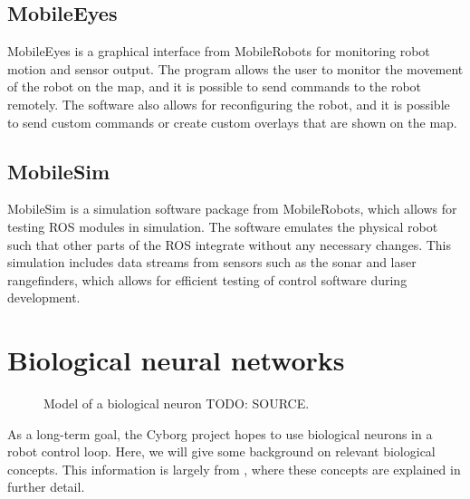 \documentclass[\rootfolder/main.tex]{subfiles}
\begin{document}
\subsection{MobileEyes}

MobileEyes is a graphical interface from MobileRobots for monitoring robot motion and sensor output.
The program allows the user to monitor the movement of the robot on the map, and it is possible to send commands to the robot remotely.
The software also allows for reconfiguring the robot, and it is possible to send custom commands or create custom overlays that are shown on the map.


\subsection{MobileSim}

MobileSim is a simulation software package from MobileRobots, which allows for testing ROS modules in simulation.
The software emulates the physical robot such that other parts of the ROS integrate without any necessary changes.
This simulation includes data streams from sensors such as the sonar and laser rangefinders, which allows for efficient testing of control software during development.


\section{Biological neural networks}

\begin{figure}
    \caption{Model of a biological neuron TODO: SOURCE.\label{fig:biological_neuron}}
\end{figure}

As a long-term goal, the Cyborg project hopes to use biological neurons in a robot control loop.
Here, we will give some background on relevant biological concepts.
This information is largely from \cite{Knudsen2016}, where these concepts are explained in further detail.
\end{document}
